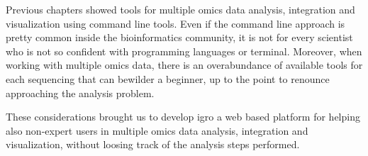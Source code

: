 Previous chapters showed tools for multiple omics data analysis, integration and visualization using command line tools.
Even if the command line approach is pretty common inside the bioinformatics community, it is not for every scientist who is not so confident with programming languages or terminal.
Moreover, when working with multiple omics data, there is an overabundance of available tools for each sequencing that can bewilder a beginner, up to the point to renounce approaching the analysis problem.

These considerations brought us to develop \gls{igro} a web based platform for helping also non-expert users in multiple omics data analysis, integration and visualization, without loosing track of the analysis steps performed.


